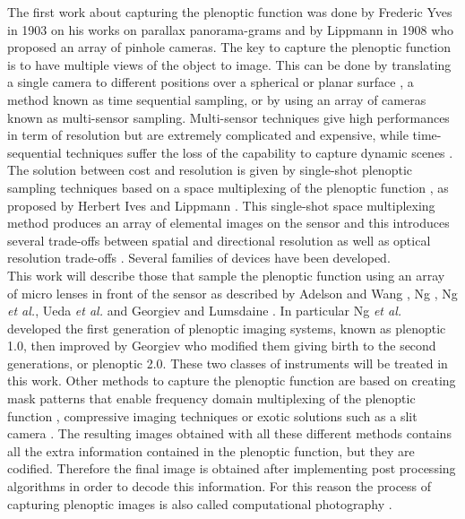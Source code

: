  The first work about capturing the plenoptic function was done by Frederic Yves in 1903 \cite{ives1903parallax} on his works on parallax panorama-grams and by Lippmann in 1908 \cite{gabriel1908photographie} who proposed an array of pinhole cameras. The key to capture the plenoptic function is to have multiple views of the object to image. This can be done by translating a single camera to different positions over a spherical or planar surface \cite{levoy1996light,taguchi2010axial,gortler1996lumigraph}, a method known as time sequential sampling, or by using an array of cameras \cite{wilburn2001light,yang2002real,nomura2007scene} known as multi-sensor sampling. Multi-sensor techniques give high performances in term of resolution but are extremely complicated and expensive, while time-sequential techniques suffer the loss of the capability to capture dynamic scenes \cite{wetzstein2011computational}. The solution between cost and resolution is given by single-shot plenoptic sampling techniques based on a space multiplexing of the plenoptic function \cite{wetzstein2011computational}, as proposed by Herbert Ives \cite{ives1930parallax} and Lippmann \cite{gabriel1908photographie}. This single-shot space multiplexing method produces an array of elemental images on the sensor and this introduces several trade-offs between spatial and directional resolution \cite{wetzstein2011computational,georgiev2006spatio} as well as optical resolution trade-offs \cite{turola2014wave}. Several families of devices have been developed.\\ This work will describe those that sample the plenoptic function using an array of micro lenses in front of the sensor as described by Adelson and Wang \cite{adelson1992single}, Ng \cite{ng2005light}, Ng \textit{et al.}\cite{ng2006digital}, Ueda \textit{et al.} \cite{ueda2008adaptive} and Georgiev and Lumsdaine \cite{georgiev2010focused}. In particular Ng \textit{et al.} developed the first generation of plenoptic imaging systems, known as plenoptic 1.0, then improved by Georgiev who modified them giving birth to the second generations, or plenoptic 2.0. These two classes of instruments will be treated in this work. Other methods to capture the plenoptic function are based on creating mask patterns that enable frequency domain multiplexing of the plenoptic function \cite{veeraraghavan2007dappled,lanman2008shield}, compressive imaging techniques \cite{marwah2013compressive} or exotic solutions such as a slit camera \cite{ji2015depth}. The resulting images obtained with all these different methods contains all the extra information contained in the plenoptic function, but they are codified. Therefore the final image is obtained after implementing post processing algorithms in order to decode this information. For this reason the process of capturing plenoptic images is also called computational photography \cite{wetzstein2011computational,nayar2006computational}.\\ 
